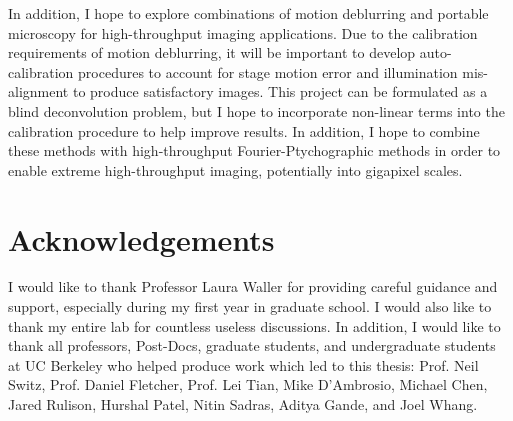 In addition, I hope to explore combinations of motion deblurring and portable microscopy for high-throughput imaging applications. Due to the calibration requirements of motion deblurring, it will be important to develop auto-calibration procedures to account for stage motion error and illumination mis-alignment to produce satisfactory images. This project can be formulated as a blind deconvolution problem, but I hope to incorporate non-linear terms into the calibration procedure to help improve results. In addition, I hope to combine these methods with high-throughput Fourier-Ptychographic methods in order to enable extreme high-throughput imaging, potentially into gigapixel scales.

\section{Acknowledgements}
I would like to thank Professor Laura Waller for providing careful guidance and support, especially during my first year in graduate school. I would also like to thank my entire lab for countless useless discussions. In addition, I would like to thank all professors, Post-Docs, graduate students, and undergraduate students at UC Berkeley who helped produce work which led to this thesis: Prof. Neil Switz, Prof. Daniel Fletcher, Prof. Lei Tian, Mike D’Ambrosio, Michael Chen, Jared Rulison, Hurshal Patel, Nitin Sadras, Aditya Gande, and Joel Whang.
